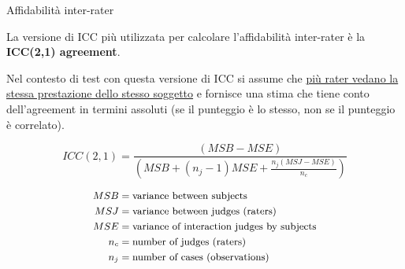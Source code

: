 \documentclass[
  ignorenonframetext,
]{beamer}
\begin{document}
\begin{frame}{Affidabilità inter-rater}
\label{affidabilituxe0-inter-rater-2}
\small

La versione di ICC più utilizzata per calcolare l'affidabilità
inter-rater è la \textbf{ICC(2,1) agreement}.

Nel contesto di test con questa versione di ICC si assume che
\underline{più rater vedano la stessa prestazione dello stesso soggetto}
e fornisce una stima che tiene conto dell'agreement in termini assoluti
(se il punteggio è lo stesso, non se il punteggio è correlato).

\[
ICC(2,1) = \frac{(MSB - MSE)}
{(MSB + (n_j - 1)MSE + \frac{n_j(MSJ - MSE)}{n_c})}
\]

\[
\small
\begin{aligned}
MSB & = \text{variance between subjects} \\
MSJ & = \text{variance between judges (raters)} \\
MSE & = \text{variance of interaction judges by subjects} \\
n_c & = \text{number of judges (raters)} \\
n_j & = \text{number of cases (observations)}
\end{aligned}
\]
\end{frame}
\end{document}
